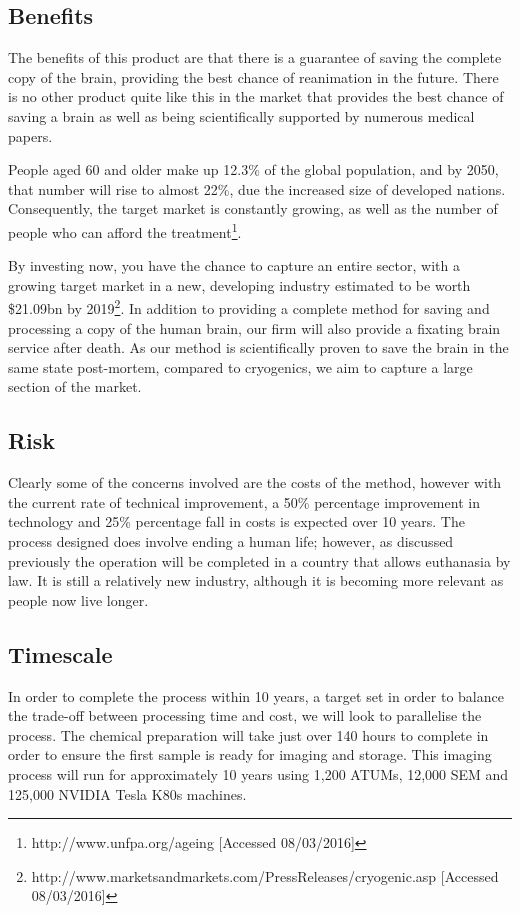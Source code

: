 \documentclass[a4paper, 11pt]{article}
\numberwithin{equation}{section}
\begin{document}
\subsection{Benefits}

The benefits of this product are that there is a guarantee of saving the complete copy of the brain, providing the best chance of reanimation in the future. There is no other product quite like this in the market that provides the best chance of saving a brain as well as being scientifically supported by numerous medical papers.

People aged 60 and older make up 12.3\% of the global population, and by 2050, that number will rise to almost 22\%, due the increased size of developed nations. Consequently, the target market is constantly growing, as well as the number of people who can afford the treatment\footnote{http://www.unfpa.org/ageing [Accessed 08/03/2016]}.

By investing now, you have the chance to capture an entire sector, with a growing target market in a new, developing industry estimated to be worth \$21.09bn by 2019\footnote{http://www.marketsandmarkets.com/PressReleases/cryogenic.asp [Accessed 08/03/2016]}. In addition to providing a complete method for saving and processing a copy of the human brain, our firm will also provide a fixating brain service after death. As our method is scientifically proven to save the brain in the same state post-mortem, compared to cryogenics, we aim to capture a large section of the market.

\subsection{Risk}

Clearly some of the concerns involved are the costs of the method, however with the current rate of technical improvement, a 50\% percentage improvement in technology and 25\% percentage fall in costs is expected over 10 years. The process designed does involve ending a human life; however, as discussed previously the operation will be completed in a country that allows euthanasia by law. It is still a relatively new industry, although it is becoming more relevant as people now live longer.

\subsection{Timescale}

In order to complete the process within 10 years, a target set in order to balance the trade-off between processing time and cost, we will look to parallelise the process. The chemical preparation will take just over 140 hours to complete in order to ensure the first sample is ready for imaging and storage. This imaging process will run for approximately 10 years using 1,200 ATUMs, 12,000 SEM and 125,000 NVIDIA Tesla K80s machines.
\end{document}
